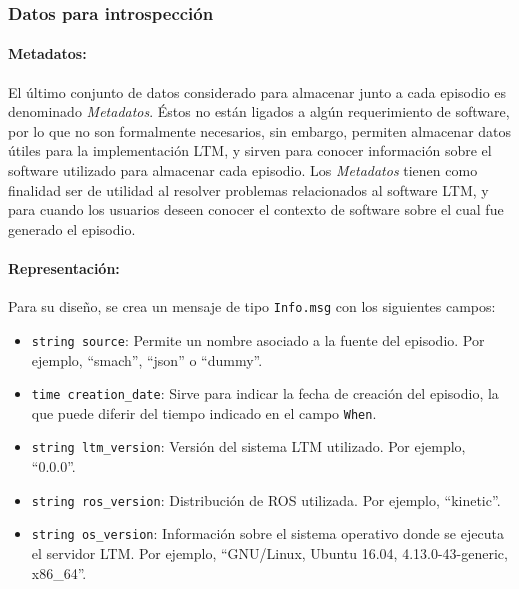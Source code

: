 \subsubsection{Datos para introspección}

\paragraph{Metadatos:}
El último conjunto de datos considerado para almacenar junto a cada episodio es denominado \textit{Metadatos}. Éstos no están ligados a algún requerimiento de software, por lo que no son formalmente necesarios, sin embargo, permiten almacenar datos útiles para la implementación LTM, y sirven para conocer información sobre el software utilizado para almacenar cada episodio. Los \textit{Metadatos} tienen como finalidad ser de utilidad al resolver problemas relacionados al software LTM, y para cuando los usuarios deseen conocer el contexto de software sobre el cual fue generado el episodio.

\paragraph{Representación:}
Para su diseño, se crea un mensaje de tipo \texttt{Info.msg} con los siguientes campos:
\begin{itemize}
\item \texttt{string source}: Permite un nombre asociado a la fuente del episodio. Por ejemplo, ``smach'', ``json'' o ``dummy''.
\item \texttt{time creation\_date}: Sirve para indicar la fecha de creación del episodio, la que puede diferir del tiempo indicado en el campo \texttt{When}.
\item \texttt{string ltm\_version}: Versión del sistema LTM utilizado. Por ejemplo, ``0.0.0''.
\item \texttt{string ros\_version}: Distribución de ROS utilizada. Por ejemplo, ``kinetic''.
\item \texttt{string os\_version}: Información sobre el sistema operativo donde se ejecuta el servidor LTM. Por ejemplo, ``GNU/Linux, Ubuntu 16.04, 4.13.0-43-generic, x86\_64''.
\end{itemize}

